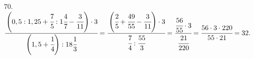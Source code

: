 70. $\cfrac{\left(0,5:1,25+\cfrac{7}{5}:1\cfrac{4}{7}-\cfrac{3}{11}\right)\cdot3}{\left(1,5+\cfrac{1}{4}\right):18\cfrac{1}{3}}=
\cfrac{\left(\cfrac{2}{5}+\cfrac{49}{55}-\cfrac{3}{11}\right)\cdot3}{\cfrac{7}{4}:\cfrac{55}{3}}=
\cfrac{\cfrac{56}{55}\cdot3}{\cfrac{21}{220}}=\cfrac{56\cdot3\cdot220}{55\cdot21}=32.$\\
